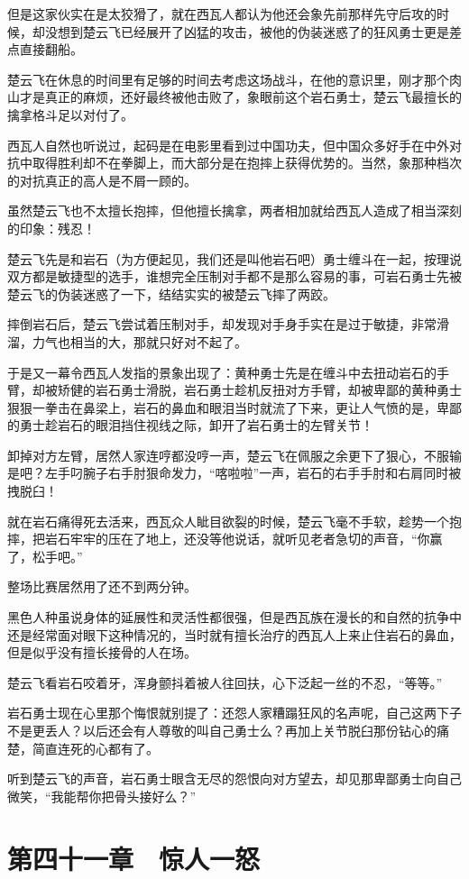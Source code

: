 但是这家伙实在是太狡猾了，就在西瓦人都认为他还会象先前那样先守后攻的时候，却没想到楚云飞已经展开了凶猛的攻击，被他的伪装迷惑了的狂风勇士更是差点直接翻船。

楚云飞在休息的时间里有足够的时间去考虑这场战斗，在他的意识里，刚才那个肉山才是真正的麻烦，还好最终被他击败了，象眼前这个岩石勇士，楚云飞最擅长的擒拿格斗足以对付了。

西瓦人自然也听说过，起码是在电影里看到过中国功夫，但中国众多好手在中外对抗中取得胜利却不在拳脚上，而大部分是在抱摔上获得优势的。当然，象那种档次的对抗真正的高人是不屑一顾的。

虽然楚云飞也不太擅长抱摔，但他擅长擒拿，两者相加就给西瓦人造成了相当深刻的印象：残忍！

楚云飞先是和岩石（为方便起见，我们还是叫他岩石吧）勇士缠斗在一起，按理说双方都是敏捷型的选手，谁想完全压制对手都不是那么容易的事，可岩石勇士先被楚云飞的伪装迷惑了一下，结结实实的被楚云飞摔了两跤。

摔倒岩石后，楚云飞尝试着压制对手，却发现对手身手实在是过于敏捷，非常滑溜，力气也相当的大，那就只好对不起了。

于是又一幕令西瓦人发指的景象出现了：黄种勇士先是在缠斗中去扭动岩石的手臂，却被矫健的岩石勇士滑脱，岩石勇士趁机反扭对方手臂，却被卑鄙的黄种勇士狠狠一拳击在鼻梁上，岩石的鼻血和眼泪当时就流了下来，更让人气愤的是，卑鄙的勇士趁岩石的眼泪挡住视线之际，卸开了岩石勇士的左臂关节！

卸掉对方左臂，居然人家连哼都没哼一声，楚云飞在佩服之余更下了狠心，不服输是吧？左手叼腕子右手肘狠命发力，“喀啦啦”一声，岩石的右手手肘和右肩同时被拽脱臼！

就在岩石痛得死去活来，西瓦众人眦目欲裂的时候，楚云飞毫不手软，趁势一个抱摔，把岩石牢牢的压在了地上，还没等他说话，就听见老者急切的声音，“你赢了，松手吧。”

整场比赛居然用了还不到两分钟。

黑色人种虽说身体的延展性和灵活性都很强，但是西瓦族在漫长的和自然的抗争中还是经常面对眼下这种情况的，当时就有擅长治疗的西瓦人上来止住岩石的鼻血，但是似乎没有擅长接骨的人在场。

楚云飞看岩石咬着牙，浑身颤抖着被人往回扶，心下泛起一丝的不忍，“等等。”

岩石勇士现在心里那个悔恨就别提了：还怨人家糟蹋狂风的名声呢，自己这两下子不是更丢人？以后还会有人尊敬的叫自己勇士么？再加上关节脱臼那份钻心的痛楚，简直连死的心都有了。

听到楚云飞的声音，岩石勇士眼含无尽的怨恨向对方望去，却见那卑鄙勇士向自己微笑，“我能帮你把骨头接好么？”

\section{第四十一章　惊人一怒}

